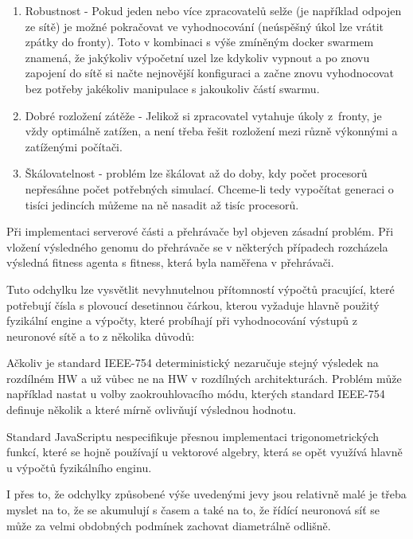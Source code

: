 \begin{enumerate}
	\item Robustnost - Pokud jeden nebo více zpracovatelů selže (je například odpojen ze sítě) je možné pokračovat ve vyhodnocování (neúspěšný úkol lze vrátit zpátky do fronty). Toto v kombinaci s výše zmíněným docker swarmem znamená, že jakýkoliv výpočetní uzel lze kdykoliv vypnout a po znovu zapojení do sítě si načte nejnovější konfiguraci a začne znovu vyhodnocovat bez potřeby jakékoliv manipulace s jakoukoliv částí swarmu.
	\item Dobré rozložení zátěže - Jelikož si zpracovatel vytahuje úkoly z~fronty, je vždy optimálně zatížen, a není třeba řešit rozložení mezi různě výkonnými a zatíženými počítači.
	\item Škálovatelnost - problém lze škálovat až do doby, kdy počet procesorů nepřesáhne počet potřebných simulací. Chceme-li tedy vypočítat generaci o tisíci jedincích můžeme na ně nasadit až tisíc procesorů.
\end{enumerate}



\label{sec:ImplementationTroubles}
Při implementaci serverové části a přehrávače byl objeven zásadní problém. Při vložení výsledného genomu do přehrávače se v některých případech rozcházela výsledná fitness agenta s fitness, která byla naměřena v přehrávači. 

Tuto odchylku lze vysvětlit nevyhnutelnou přítomností výpočtů pracující, které potřebují čísla s plovoucí desetinnou čárkou, kterou vyžaduje hlavně použitý fyzikální engine a výpočty, které probíhají při vyhodnocování výstupů z neuronové sítě a to z několika důvodů:

Ačkoliv je standard IEEE-754 deterministický nezaručuje stejný výsledek na rozdílném HW a už vůbec ne na HW v rozdílných architekturách. Problém může například nastat u volby zaokrouhlovacího módu, kterých standard IEEE-754 definuje několik a které mírně ovlivňují výslednou hodnotu.

Standard JavaScriptu nespecifikuje přesnou implementaci trigonometrických funkcí, které se hojně používají u vektorové algebry, která se opět využívá hlavně u výpočtů fyzikálního enginu.

I přes to, že odchylky způsobené výše uvedenými jevy jsou relativně malé je třeba myslet na to, že se akumulují s časem a také na to, že řídící neuronová síť se může za velmi obdobných podmínek zachovat diametrálně odlišně. 

